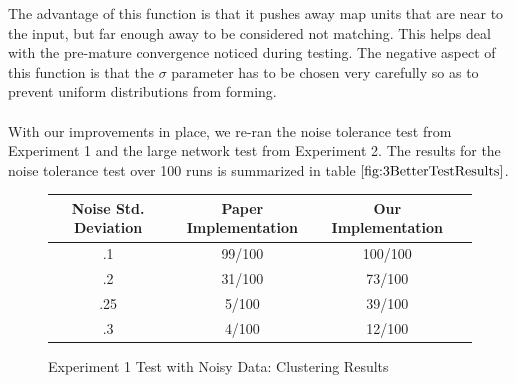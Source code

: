 \documentclass[a4paper,10pt]{article}
\begin{document}
The advantage of this function is that it pushes away map units that are near to the input,
but far enough away to be considered not matching.  This helps deal with the pre-mature convergence
noticed during testing. The negative aspect of this function is that the $\sigma$ parameter has to
be chosen very carefully so as to prevent uniform distributions from forming.
\\
\\
With our improvements in place, we re-ran the noise tolerance test from Experiment 1 and the large
network test from Experiment 2.  The results for the noise tolerance test over 100 runs is
summarized in table $\ref{fig:3BetterTestResults}$.
\begin{figure}[ht]
\begin{center}
  \begin{tabular}{ | c | c | c | c | }
    \hline
    Noise Std. Deviation & Paper Implementation& Our Implementation \\ \hline
    .1 & 99/100 & 100/100 \\ \hline
    .2 & 31/100 & 73/100\\ \hline
    .25 & 5/100 & 39/100\\ \hline
    .3 &  4/100 & 12/100\\
    \hline
  \end{tabular}
\end{center}
\caption{Experiment 1 Test with Noisy Data: Clustering Results }
\label{fig:3BetterTestResults}
\end{figure}
\end{document}
